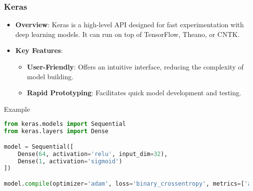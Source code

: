 \documentclass[aspectratio=169]{beamer}
\begin{document}
\begin{frame}[fragile]
  \frametitle{Keras}
  \begin{itemize}
    \item \textbf{Overview}: Keras is a high-level API designed for fast experimentation with deep learning models. It can run on top of TensorFlow, Theano, or CNTK.
    \item \textbf{Key Features}:
      \begin{itemize}
        \item \textbf{User-Friendly}: Offers an intuitive interface, reducing the complexity of model building.
        \item \textbf{Rapid Prototyping}: Facilitates quick model development and testing.
      \end{itemize}
  \end{itemize}

  \begin{block}{Example}
    \begin{lstlisting}[language=Python]
from keras.models import Sequential
from keras.layers import Dense

model = Sequential([
    Dense(64, activation='relu', input_dim=32),
    Dense(1, activation='sigmoid')
])

model.compile(optimizer='adam', loss='binary_crossentropy', metrics=['accuracy'])
    \end{lstlisting}
  \end{block}
\end{frame}
\end{document}
